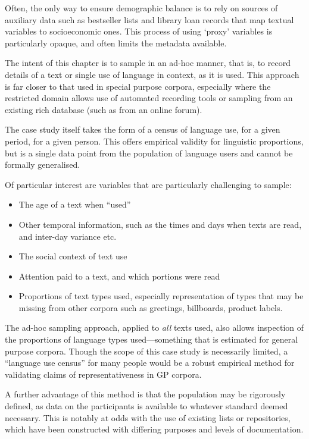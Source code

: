 Often, the only way to ensure demographic balance is to rely on sources of auxiliary data such as bestseller lists and library loan records that map textual variables to socioeconomic ones.  This process of using `proxy' variables is particularly opaque, and often limits the metadata available.

The intent of this chapter is to sample in an ad-hoc manner, that is, to record details of a text or single use of language in context, as it is used.  This approach is far closer to that used in special purpose corpora, especially where the restricted domain allows use of automated recording tools or sampling from an existing rich database (such as from an online forum).

The case study itself takes the form of a census of language use, for a given period, for a given person.  This offers empirical validity for linguistic proportions, but is a single data point from the population of language users and cannot be formally generalised.

Of particular interest are variables that are particularly challenging to sample:

\begin{itemize}
    \item The age of a text when ``used''
    \item Other temporal information, such as the times and days when texts are read, and inter-day variance etc.
    \item The social context of text use
    \item Attention paid to a text, and which portions were read
    \item Proportions of text types used, especially representation of types that may be missing from other corpora such as greetings, billboards, product labels.
\end{itemize}

The ad-hoc sampling approach, applied to \textsl{all} texts used, also allows inspection of the proportions of language types used---something that is estimated for general purpose corpora.  Though the scope of this case study is necessarily limited, a ``language use census'' for many people would be a robust empirical method for validating claims of representativeness in GP corpora.


A further advantage of this method is that the population may be rigorously defined, as data on the participants is available to whatever standard deemed necessary.  This is notably at odds with the use of existing lists or repositories, which have been constructed with differing purposes and levels of documentation.






